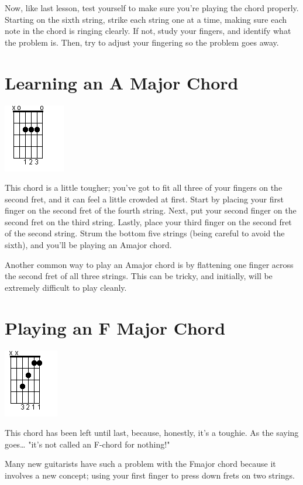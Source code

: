 Now, like last lesson, test yourself to make sure you're playing the chord
properly. Starting on the sixth string, strike each string one at a time,
making sure each note in the chord is ringing clearly. If not, study your
fingers, and identify what the problem is. Then, try to adjust your fingering
so the problem goes away.

\section{Learning an A Major Chord}
\includegraphics{partthree/openamajor.png}

This chord is a little tougher; you've got to fit all three of your fingers on
the second fret, and it can feel a little crowded at first. Start by placing
your first finger on the second fret of the fourth string. Next, put your
second finger on the second fret on the third string. Lastly, place your third
finger on the second fret of the second string. Strum the bottom five strings
(being careful to avoid the sixth), and you'll be playing an Amajor chord.

Another common way to play an Amajor chord is by flattening one finger across
the second fret of all three strings. This can be tricky, and initially, will
be extremely difficult to play cleanly.

\section{Playing an F Major Chord}
\includegraphics{partthree/openfmajor.png}

This chord has been left until last, because, honestly, it's a toughie. As the
saying goes\ldots{} "it's not called an F-chord for nothing!"

Many new guitarists have such a problem with the Fmajor chord because it
involves a new concept; using your first finger to press down frets on two
strings.

